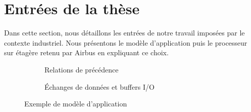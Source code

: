 \documentclass[main.tex]{subfiles}
\begin{document}
\section{Entrées de la thèse}
Dans cette section, nous détaillons les entrées de notre travail imposées par le contexte industriel. Nous présentons le modèle d'application puis le processeur sur étagère retenu par Airbus en expliquant ce choix.

\begin{figure}
    \centering
    \begin{subfigure}[b]{0.49\linewidth}
        \centering
        
        \caption{Relations de précédence}
        \label{fig_resumeFr_appModelPrecs}
    \end{subfigure}
    \begin{subfigure}[b]{0.49\linewidth}
        \centering
        
        \caption{Échanges de données et buffers I/O}
        \label{fig_resumeFr_appModelDataflow}
    \end{subfigure}
    \caption{Exemple de modèle d'application}
    \label{fig_resumeFr_appModelExample}
\end{figure}
\end{document}
